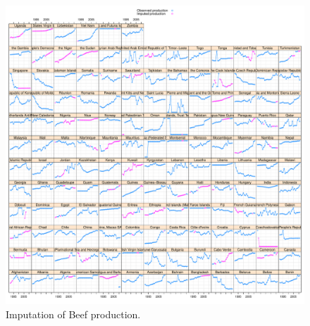 \documentclass[nojss]{jss}\usepackage[]{graphicx}\usepackage[]{color}
\makeatletter
\def\maxwidth{ %
  \ifdim\Gin@nat@width>\linewidth
    \linewidth
  \else
    \Gin@nat@width
  \fi
}
\newenvironment{knitrout}{}{} %
\makeatother
\begin{document}
\begin{knitrout}
\color{fgcolor}\begin{figure}[!ht]


{\centering \includegraphics[width=\maxwidth]{figure/beef-production-imputed} 

}

\caption[Imputation of Beef production]{Imputation of Beef production.\label{fig:beef-production-imputed}}
\end{figure}


\end{knitrout}
\end{document}
